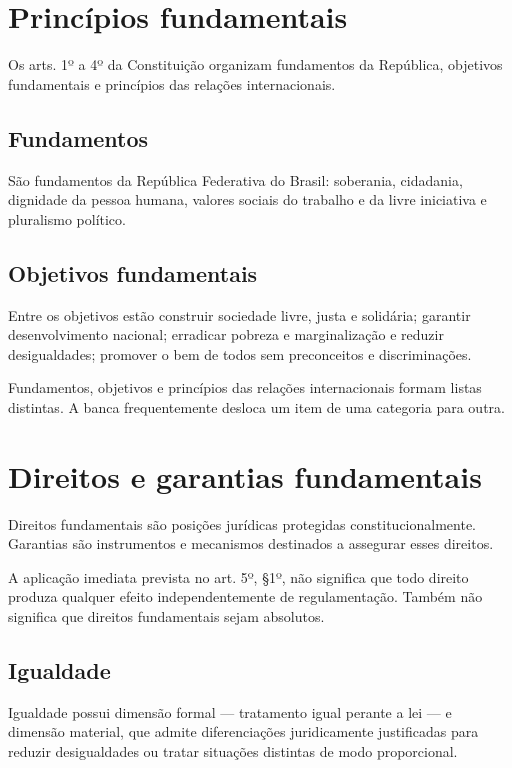 \section{Princípios fundamentais}

Os arts. 1º a 4º da Constituição organizam fundamentos da República, objetivos fundamentais e princípios das relações internacionais.

\subsection{Fundamentos}

São fundamentos da República Federativa do Brasil: soberania, cidadania, dignidade da pessoa humana, valores sociais do trabalho e da livre iniciativa e pluralismo político.

\subsection{Objetivos fundamentais}

Entre os objetivos estão construir sociedade livre, justa e solidária; garantir desenvolvimento nacional; erradicar pobreza e marginalização e reduzir desigualdades; promover o bem de todos sem preconceitos e discriminações.

\begin{atencao}
Fundamentos, objetivos e princípios das relações internacionais formam listas distintas. A banca frequentemente desloca um item de uma categoria para outra.
\end{atencao}

\section{Direitos e garantias fundamentais}

Direitos fundamentais são posições jurídicas protegidas constitucionalmente. Garantias são instrumentos e mecanismos destinados a assegurar esses direitos.

A aplicação imediata prevista no art. 5º, §1º, não significa que todo direito produza qualquer efeito independentemente de regulamentação. Também não significa que direitos fundamentais sejam absolutos.

\subsection{Igualdade}

Igualdade possui dimensão formal — tratamento igual perante a lei — e dimensão material, que admite diferenciações juridicamente justificadas para reduzir desigualdades ou tratar situações distintas de modo proporcional.

